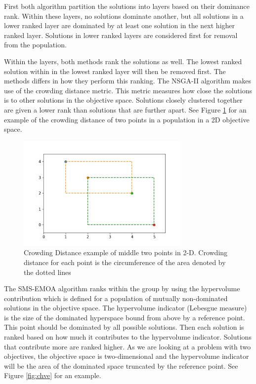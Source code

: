 \documentclass[11pt]{article}
\theoremstyle{definition}
\begin{document}
First both algorithm partition the solutions into layers based on their dominance rank. Within these layers, no solutions dominate another, but all solutions in a lower ranked layer are dominated by at least one solution in the next higher ranked layer. Solutions in lower ranked layers are considered first for removal from the population.

Within the layers, both methods rank the solutions as well. The lowest ranked solution within in the lowest ranked layer will then be removed first. The methods differs in how they perform this ranking. The NSGA-II algorithm makes use of the crowding distance metric. This metric measures how close the solutions is to other solutions in the objective space. Solutions closely clustered together are given a lower rank than solutions that are further apart. See Figure \ref{fig:cde} for an example of the crowding distance of two points in a population in a 2D objective space.

\begin{figure}[h!]
  \centering
    \includegraphics[width=0.75\textwidth]{other_img/crowding}
  \caption{Crowding Distance example of middle two points in 2-D. Crowding distance for each point is the circumference of the area denoted by the dotted lines}
  \label{fig:cde}
\end{figure}

The SMS-EMOA algorithm ranks within the group by using the hypervolume contribution which is defined for a population of mutually non-dominated solutions in the objective space. The hypervolume indicator (Lebesgue measure) is the size of the dominated hyperspace bound from above by a reference point. This point should be dominated by all possible solutions. Then each solution is ranked based on how much it contributes to the hypervolume indicator. Solutions that contribute more are ranked higher. As we are looking at a problem with two objectives, the objective space is two-dimensional and the hypervolume indicator will be the area of the dominated space truncated by the reference point. See Figure \ref{fig:chve} for an example.
\end{document}
